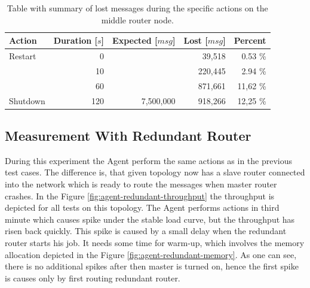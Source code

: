 \begingroup
\setlength{\tabcolsep}{10pt} %
\renewcommand{\arraystretch}{1.35} %
	\begin{table}[H]
	\centering
	\begin{tabular}{|l|r|r|r|r|}
	\hline
	\rowcolor[HTML]{C5E3DF}
	\textbf{Action} & \textbf{Duration [$s$]} & \textbf{Expected [$msg$]} & \textbf{Lost [$msg$]} & \textbf{Percent} \\ \hline
	Restart & 0 & & 39,518 & 0.53 \% \\ \cline{1-2} \cline{4-5}
	 & 10 & & 220,445 & 2.94 \% \\ \cline{2-2} \cline{4-5}
	 & 60 & & 871,661 & 11,62 \% \\ \cline{2-2} \cline{4-5}
	\multirow{-3}{*}{Shutdown} & 120 & \multirow{-4}{*}{7,500,000} & 918,266 & 12,25 \% \\ \hline
	\end{tabular}
	\caption{Table with summary of lost messages during the specific actions on the middle router node.}
	\label{tab:agent_demonstration}
	\end{table}
\endgroup


\subsection{Measurement With Redundant Router}
During this experiment the Agent perform the same actions as in the previous test cases. The difference is, that given topology now has a slave router connected into the network which is ready to route the messages when master router crashes. In the Figure \ref{fig:agent-redundant-throughput} the throughput is depicted for all tests on this topology. The Agent performs actions in third minute which causes spike under the stable load curve, but the throughput has risen back quickly. This spike is caused by a small delay when the redundant router starts his job. It needs some time for warm-up, which involves the memory allocation depicted in the Figure \ref{fig:agent-redundant-memory}. As one can see, there is no additional spikes after then master is turned on, hence the first spike is causes only by first routing redundant router.

